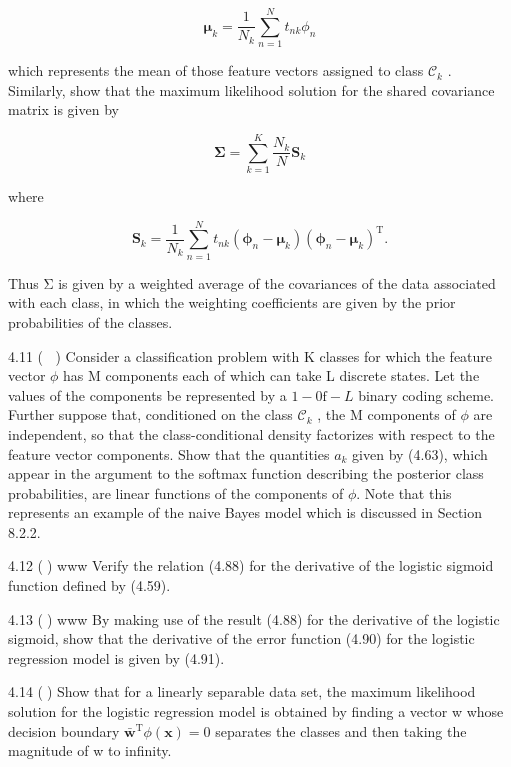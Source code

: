 \documentclass[
  10
]{article}
\begin{document}
\[
\pmb {\mu} _ {k} = \frac {1}{N _ {k}} \sum_ {n = 1} ^ {N} t _ {n k} \phi_ {n}\tag{4.161}
\]

which represents the mean of those feature vectors assigned to class
\(\mathcal { C } _ { k }\) . Similarly, show that the maximum likelihood
solution for the shared covariance matrix is given by

\[
\pmb {\Sigma} = \sum_ {k = 1} ^ {K} \frac {N _ {k}}{N} \mathbf {S} _ {k}\tag{4.162}
\]

where

\[
\mathbf {S} _ {k} = \frac {1}{N _ {k}} \sum_ {n = 1} ^ {N} t _ {n k} (\boldsymbol {\phi} _ {n} - \boldsymbol {\mu} _ {k}) (\boldsymbol {\phi} _ {n} - \boldsymbol {\mu} _ {k}) ^ {\mathrm{T}}.\tag{4.163}
\]

Thus Σ is given by a weighted average of the covariances of the data
associated with each class, in which the weighting coefficients are
given by the prior probabilities of the classes.

4.11 ( ) Consider a classification problem with K classes for which the
feature vector \(\phi\) has M components each of which can take L
discrete states. Let the values of the components be represented by a
\(1 { - } 0 \mathrm { f - } L\) binary coding scheme. Further suppose
that, conditioned on the class \(\mathcal { C } _ { k }\) , the M
components of \(\phi\) are independent, so that the class-conditional
density factorizes with respect to the feature vector components. Show
that the quantities \(a _ { k }\) given by (4.63), which appear in the
argument to the softmax function describing the posterior class
probabilities, are linear functions of the components of \(\phi .\) Note
that this represents an example of the naive Bayes model which is
discussed in Section 8.2.2.

4.12 () www Verify the relation (4.88) for the derivative of the
logistic sigmoid function defined by (4.59).

4.13 () www By making use of the result (4.88) for the derivative of the
logistic sigmoid, show that the derivative of the error function (4.90)
for the logistic regression model is given by (4.91).

4.14 () Show that for a linearly separable data set, the maximum
likelihood solution for the logistic regression model is obtained by
finding a vector w whose decision boundary
\(\mathbf { \bar { w } } ^ { \mathrm { T } } \phi ( \mathbf { x } ) = 0\)
separates the classes and then taking the magnitude of w to infinity.
\end{document}
